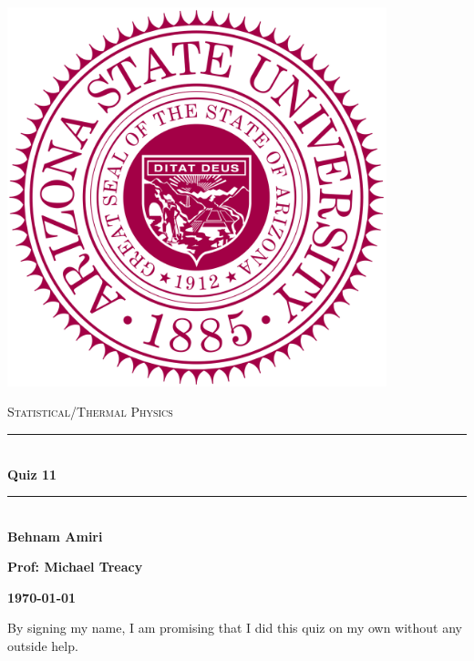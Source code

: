 \documentclass[fleqn]{article}
\begin{document}
  \begin{titlepage}

    \newcommand{\HRule}{\rule{\linewidth}{0.5mm}}

    \center

    \begin{center}
      \includegraphics[height=11cm, width=11cm]{asu.png}
    \end{center}

    \vline

    \textsc{\LARGE Statistical/Thermal Physics}\\[1.5cm]

    \HRule \\[0.5cm]
    { \huge \bfseries Quiz 11}\\[0.4cm] 
    \HRule \\[1.0cm]

    \textbf{Behnam Amiri}

    \bigbreak

    \textbf{Prof: Michael Treacy}

    \bigbreak

    \textbf{{\large \today}\\[2cm]}

    \vfill

  \end{titlepage}

  By signing my name, I am promising that I did this quiz on my own without any outside help.

  \vspace{0.5cm}
\end{document}
